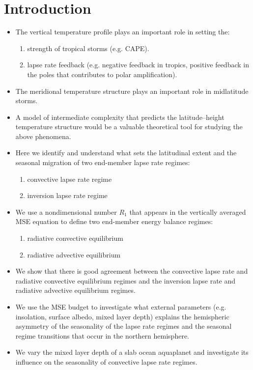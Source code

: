 \documentclass{ametsocV5}
\begin{document}
\section{Introduction}
\begin{itemize}
  \item The vertical temperature profile plays an important role in setting the:
        \begin{enumerate}
          \item strength of tropical storms (e.g. CAPE).
          \item lapse rate feedback (e.g. negative feedback in tropics, positive feedback in the poles that contributes to polar amplification).
        \end{enumerate}
  \item The meridional temperature structure plays an important role in midlatitude storms.
  \item A model of intermediate complexity that predicts the latitude--height temperature structure would be a valuable theoretical tool for studying the above phenomena.
  \item Here we identify and understand what sets the latitudinal extent and the seasonal migration of two end-member lapse rate regimes:
        \begin{enumerate}
          \item convective lapse rate regime
          \item inversion lapse rate regime
        \end{enumerate}
  \item We use a nondimensional number \(R_{1}\) that appears in the vertically averaged MSE equation to define two end-member energy balance regimes:
        \begin{enumerate}
          \item radiative convective equilibrium
          \item radiative advective equilibrium
        \end{enumerate}
  \item We show that there is good agreement between the convective lapse rate and radiative convective equilibrium regimes and the inversion lapse rate and radiative advective equilibrium regimes.
  \item We use the MSE budget to investigate what external parameters (e.g. insolation, surface albedo, mixed layer depth) explains the hemispheric asymmetry of the seasonality of the lapse rate regimes and the seasonal regime transitions that occur in the northern hemisphere.
  \item We vary the mixed layer depth of a slab ocean aquaplanet and investigate its influence on the seasonality of convective lapse rate regimes.
\end{itemize}
\end{document}
